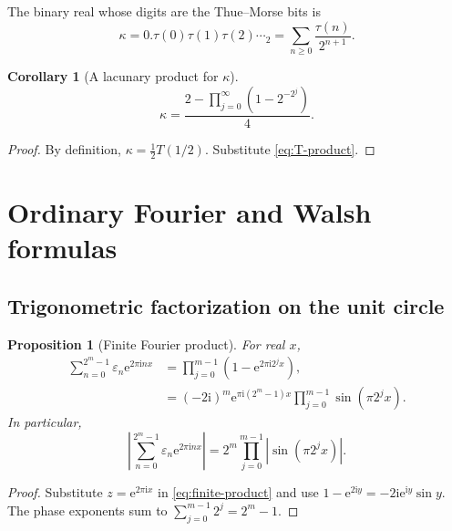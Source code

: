 \documentclass[11pt,oneside]{article}
\newtheorem{proposition}[theorem]{Proposition}
\newtheorem{corollary}[theorem]{Corollary}
\theoremstyle{definition}
\theoremstyle{remark}
\newcommand{\e}{\mathrm e}
\newcommand{\ii}{\mathrm i}
\newcommand{\eps}{\varepsilon}
\newcommand{\1}{\mathbf 1}
\begin{document}
The binary real whose digits are the Thue--Morse bits is
\begin{equation}
 \kappa=0.\tau(0)\tau(1)\tau(2)\cdots{}_2
       =\sum_{n\ge0}\frac{\tau(n)}{2^{n+1}}.
 \label{eq:kappa-def}
\end{equation}

\begin{corollary}[A lacunary product for \(\kappa\)]
\label{cor:kappa}
\begin{equation}
 \boxed{
 \kappa=\frac{2-\displaystyle\prod_{j=0}^{\infty}
                    \left(1-2^{-2^j}\right)}4.}
 \label{eq:kappa-product}
\end{equation}
\end{corollary}

\begin{proof}
By definition, \(\kappa=\tfrac12T(1/2)\).  Substitute \eqref{eq:T-product}.
\end{proof}

\section{Ordinary Fourier and Walsh formulas}
\label{sec:fourier}

\subsection{Trigonometric factorization on the unit circle}

\begin{proposition}[Finite Fourier product]
\label{prop:unit-circle}
For real \(x\),
\begin{align}
 \sum_{n=0}^{2^m-1}\eps_n\e^{2\pi\ii nx}
 &=\prod_{j=0}^{m-1}\left(1-\e^{2\pi\ii2^jx}\right),
 \label{eq:fourier-product}\\
 &=(-2\ii)^m\e^{\pi\ii(2^m-1)x}
   \prod_{j=0}^{m-1}\sin(\pi2^jx).                         \label{eq:sine-fourier}
\end{align}
In particular,
\begin{equation}
 \left|\sum_{n=0}^{2^m-1}\eps_n\e^{2\pi\ii nx}\right|
 =2^m\prod_{j=0}^{m-1}|\sin(\pi2^jx)|.
 \label{eq:fourier-magnitude}
\end{equation}
\end{proposition}

\begin{proof}
Substitute \(z=\e^{2\pi\ii x}\) in \eqref{eq:finite-product} and use
\(1-\e^{2\ii y}=-2\ii\e^{\ii y}\sin y\).  The phase exponents sum to
\(\sum_{j=0}^{m-1}2^j=2^m-1\).
\end{proof}
\end{document}
